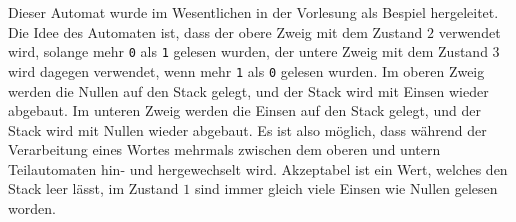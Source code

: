 
\begin{hinweis}
Dieser Automat wurde im Wesentlichen in der Vorlesung als Bespiel
hergeleitet. Die Idee des Automaten ist, dass der obere Zweig mit
dem Zustand $2$ verwendet wird, solange mehr \texttt{0} als \texttt{1}
gelesen wurden, der untere Zweig mit dem Zustand $3$ wird
dagegen verwendet, wenn mehr \texttt{1} als \texttt{0} gelesen wurden.
Im oberen Zweig werden die Nullen auf den Stack gelegt, und der Stack wird
mit Einsen wieder abgebaut.
Im unteren Zweig werden die Einsen auf den Stack gelegt, und der Stack
wird mit Nullen wieder abgebaut.
Es ist also möglich, dass während der Verarbeitung eines Wortes
mehrmals zwischen dem oberen und untern Teilautomaten hin- und hergewechselt
wird.
Akzeptabel ist ein Wert, welches den Stack leer lässt, im Zustand $1$
sind immer gleich viele Einsen wie Nullen gelesen worden.
\end{hinweis}


